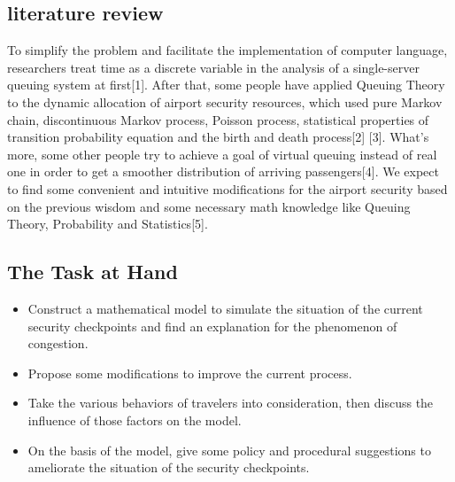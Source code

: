 \documentclass{mcmthesis}
\begin{document}
\subsection{literature review}
To simplify the problem and facilitate the implementation of computer language,
researchers treat time as a discrete variable in the analysis of a single-server queuing
system at first[1]. After that, some people have applied Queuing Theory to the dynamic
allocation of airport security resources, which used pure Markov chain, discontinuous
Markov process, Poisson process, statistical properties of transition probability equation
and the birth and death process[2] [3]. What's more, some other people try to achieve a goal of virtual queuing instead of real one in order to get a smoother distribution of arriving passengers[4]. We expect to find some convenient and intuitive modifications for
the airport security based on the previous wisdom and some necessary math knowledge
like Queuing Theory, Probability and Statistics[5].


\subsection{The Task at Hand}
\begin{itemize}
\item Construct a mathematical model to simulate the situation of the current security
checkpoints and find an explanation for the phenomenon of congestion.
\item Propose some modifications to improve the current process.
\item Take the various behaviors of travelers into consideration, then discuss the influence of those factors on the model.
\item On the basis of the model, give some policy and procedural suggestions to ameliorate the situation of the security checkpoints.
\end{itemize}

\end{document}
